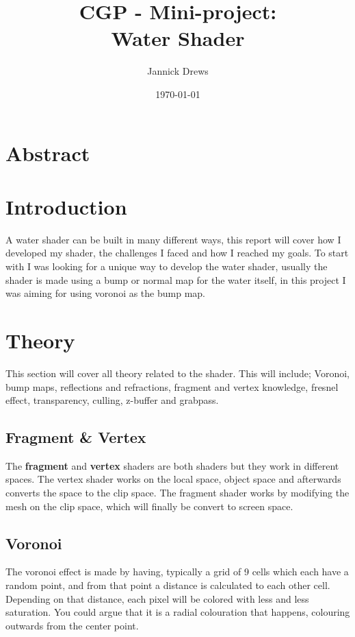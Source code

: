 \documentclass{article}
\title{CGP - Mini-project:\\Water Shader}
\author{Jannick Drews}
\date{\today}
\begin{document}
\maketitle
\newpage
{}


\section{Abstract}
\label{sec:abstract}


\section{Introduction}
\label{sec:introduction}
A water shader can be built in many different ways, this report will cover how I developed my shader, the challenges I faced and how I reached my goals. To start with I was looking for a unique way to develop the water shader, usually the shader is made using a bump or normal map for the water itself, in this project I was aiming for using voronoi as the bump map.

\section{Theory}
\label{sec:theory}
This section will cover all theory related to the shader. This will include; Voronoi, bump maps, reflections and refractions, fragment and vertex knowledge, fresnel effect, transparency, culling, z-buffer and grabpass.

\subsection{Fragment \& Vertex}
\label{sec:frag_vert}
The \textbf{fragment} and \textbf{vertex} shaders are both shaders but they work in different spaces. The vertex shader works on the local space, object space and afterwards converts the space to the clip space. The fragment shader works by modifying the mesh on the clip space, which will finally be convert to screen space\cite{progrendervertfrag}.


\subsection{Voronoi}
\label{sec:voronoi}
The voronoi effect is made by having, typically a grid of 9 cells which each have a random point, and from that point a distance is calculated to each other cell. Depending on that distance, each pixel will be colored with less and less saturation. You could argue that it is a radial colouration that happens, colouring outwards from the center point.\\
\end{document}

